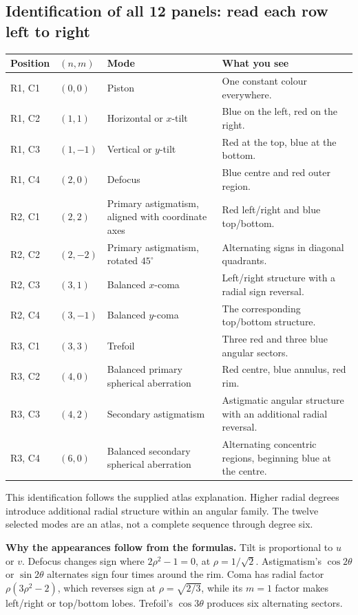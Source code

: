 \subsection{Identification of all 12 panels: read each row left to right}
\begin{longtable}{@{}p{}p{}p{}p{}@{}}
\toprule Position & $(n,m)$ & Mode & What you see\\\midrule\endhead
R1, C1 & $(0,0)$ & Piston & One constant colour everywhere.\\
R1, C2 & $(1,1)$ & Horizontal or $x$-tilt & Blue on the left, red on the right.\\
R1, C3 & $(1,-1)$ & Vertical or $y$-tilt & Red at the top, blue at the bottom.\\
R1, C4 & $(2,0)$ & Defocus & Blue centre and red outer region.\\
R2, C1 & $(2,2)$ & Primary astigmatism, aligned with coordinate axes & Red left/right and blue top/bottom.\\
R2, C2 & $(2,-2)$ & Primary astigmatism, rotated $45^\circ$ & Alternating signs in diagonal quadrants.\\
R2, C3 & $(3,1)$ & Balanced $x$-coma & Left/right structure with a radial sign reversal.\\
R2, C4 & $(3,-1)$ & Balanced $y$-coma & The corresponding top/bottom structure.\\
R3, C1 & $(3,3)$ & Trefoil & Three red and three blue angular sectors.\\
R3, C2 & $(4,0)$ & Balanced primary spherical aberration & Red centre, blue annulus, red rim.\\
R3, C3 & $(4,2)$ & Secondary astigmatism & Astigmatic angular structure with an additional radial reversal.\\
R3, C4 & $(6,0)$ & Balanced secondary spherical aberration & Alternating concentric regions, beginning blue at the centre.\\\bottomrule
\end{longtable}
This identification follows the supplied atlas explanation. Higher radial degrees introduce additional radial structure within an angular family. The twelve selected modes are an atlas, not a complete sequence through degree six.

\textbf{Why the appearances follow from the formulas.} Tilt is proportional to $u$ or $v$. Defocus changes sign where $2\rho^2-1=0$, at $\rho=1/\sqrt2$. Astigmatism's $\cos2\theta$ or $\sin2\theta$ alternates sign four times around the rim. Coma has radial factor $\rho(3\rho^2-2)$, which reverses sign at $\rho=\sqrt{2/3}$, while its $m=1$ factor makes left/right or top/bottom lobes. Trefoil's $\cos3\theta$ produces six alternating sectors.

